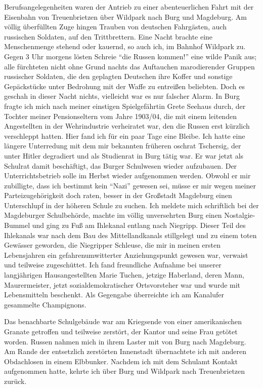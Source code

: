 Berufsangelegenheiten waren der Antrieb zu einer abenteuerlichen Fahrt mit der Eisenbahn von Treuenbrietzen über Wildpark nach Burg und Magdeburg. Am völlig überfüllten Zuge hingen Trauben von deutschen Fahrgästen, auch russischen Soldaten, auf den Trittbrettern. Eine Nacht brachte eine Menschenmenge stehend oder kauernd, so auch ich, im Bahnhof Wildpark zu. Gegen 3 Uhr morgens lösten Schreie \enquote{die Russen kommen!} eine wilde Panik aus; alle fürchteten nicht ohne Grund nachts das Auftauchen marodierender Gruppen russischer Soldaten, die den geplagten Deutschen ihre Koffer und sonstige Gepäckstücke unter  Bedrohung mit der Waffe zu entreißen beliebten. Doch es geschah in dieser Nacht nichts, vielleicht war es nur falscher Alarm. In Burg fragte ich mich nach meiner einstigen Spielgefährtin Grete Seehaus durch, der Tochter meiner Pensionseltern vom Jahre 1903/04, die mit einem leitenden Angestellten in der Wehrindustrie verheiratet war, den die Russen erst kürzlich verschleppt hatten. Hier fand ich für ein paar Tage eine Bleibe. Ich hatte eine längere Unterredung mit dem mir bekannten früheren \ac{oschrat} Tschersig, der unter Hitler degradiert und als Studienrat in Burg tätig war. Er war jetzt als Schulrat damit beschäftigt, das Burger Schulwesen wieder aufzubauen. Der Unterrichtsbetrieb solle im Herbst wieder aufgenommen werden. Obwohl er mir zubilligte, dass ich bestimmt kein \enquote{Nazi} gewesen sei, müsse er mir wegen meiner Parteizugehörigkeit doch raten, besser in der Großstadt Magdeburg einen Unterschlupf in der höheren Schule zu suchen. Ich meldete mich schriftlich bei der Magdeburger Schulbehörde, machte im völlig unversehrten Burg einen Nostalgie-Bummel und ging zu Fuß am Ihlekanal entlang nach Niegripp. Dieser Teil des Ihlekanals war nach dem Bau des Mittellandkanals  stillgelegt und zu einem toten Gewässer geworden, die Niegripper Schleuse, die mir in meinen ersten Lebensjahren ein gefahrenumwitterter Anziehungspunkt gewesen war, verwaist und teilweise zugeschüttet. Ich fand freundliche Aufnahme bei unserer langjährigen Hausangestellten Marie Tuchen, jetzige Haberland, deren Mann, Maurermeister, jetzt sozialdemokratischer Ortsvorsteher war und wurde mit Lebensmitteln beschenkt. Als Gegengabe überreichte ich am Kanalufer gesammelte Champignons.

Das benachbarte Schulgebäude war am Kriegsende von einer amerikanischen Granate getroffen und teilweise zerstört, der Kantor und seine Frau getötet worden. Russen nahmen mich in ihrem Laster mit von Burg nach Magdeburg. Am Rande der entsetzlich zerstörten Innenstadt übernachtete ich mit anderen Obdachlosen in einem Elbbunker. Nachdem ich mit dem Schulamt Kontakt aufgenommen hatte, kehrte ich über Burg und Wildpark nach Treuenbrietzen zurück.

